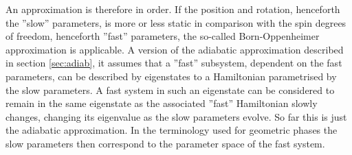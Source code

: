\documentclass[a4paper]{article}
\begin{document}
An approximation is therefore in order. If the position and rotation,
henceforth the ''slow'' parameters,
is more or less static in comparison with the spin degrees of freedom, henceforth ''fast''
parameters, the so-called Born-Oppenheimer approximation is applicable. A version of the
adiabatic approximation described in section \ref{sec:adiab}, it assumes that a ''fast''
subsystem, dependent on the fast
parameters, can be described by eigenstates to a Hamiltonian parametrised by the slow
parameters. A fast system in such an eigenstate can be considered to remain in the same
eigenstate as the associated ''fast'' Hamiltonian slowly changes, changing its
eigenvalue as the slow parameters evolve. So far this is just the adiabatic
approximation. In the terminology used for geometric phases the slow
parameters then correspond to the parameter space of the fast system. %
\end{document}

